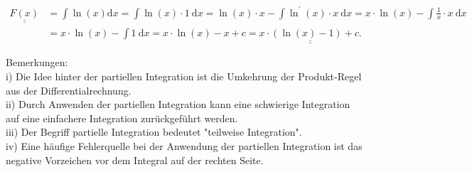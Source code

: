 \documentclass[10pt]{article}
\begin{document}
\begin{align*}
\underline{\underline{F(x)}} & =\int \ln (x) \mathrm{d} x=\int \ln (x) \cdot 1 \mathrm{~d} x=\ln (x) \cdot x-\int \ln ^{\prime}(x) \cdot x \mathrm{~d} x=x \cdot \ln (x)-\int \frac{1}{x} \cdot x \mathrm{~d} x \\
& =x \cdot \ln (x)-\int 1 \mathrm{~d} x=x \cdot \ln (x)-x+c=\underline{\underline{x \cdot(\ln (x)-1)+c .}} \tag{3.27}
\end{align*}


Bemerkungen:\\
i) Die Idee hinter der partiellen Integration ist die Umkehrung der Produkt-Regel aus der Differentialrechnung.\\
ii) Durch Anwenden der partiellen Integration kann eine schwierige Integration auf eine einfachere Integration zurückgeführt werden.\\
iii) Der Begriff partielle Integration bedeutet "teilweise Integration".\\
iv) Eine häufige Fehlerquelle bei der Anwendung der partiellen Integration ist das negative Vorzeichen vor dem Integral auf der rechten Seite.
\end{document}
